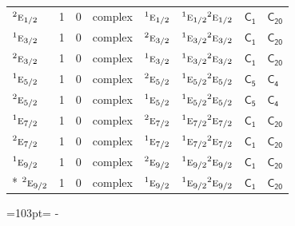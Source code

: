 \documentclass[10pt,a4paper]{article}
\newcommand{\needspace}[1]{\par\penalty-100\begingroup\dimen0=#1\relax\dimen2=\pagegoal
  \advance\dimen2-\pagetotal\ifdim\dimen0>\dimen2\relax\ifdim\dimen2>0pt\vfil\break\fi\fi
  \endgroup}
\numberwithin{equation}{section}
\newcommand{\grp}[1]{\mathsf{#1}}
\newcommand{\irr}[1]{\text{\normalfont\scshape #1}}
\newcommand{\conjpair}[1]{{}^{#1}}
\begin{document}
{\begin{longtable}{@{}lrrlllll@{}}
$\conjpair{2}\irr{e}_{1/2}$ & 1 & $0$ & complex & $\conjpair{1}\irr{e}_{1/2}$ & $\conjpair{1}\irr{e}_{1/2}\conjpair{2}\irr{e}_{1/2}$ & \href{C1.pdf}{$\grp{C_{1}}$} & $\grp{C_{20}}$\\
$\conjpair{1}\irr{e}_{3/2}$ & 1 & $0$ & complex & $\conjpair{2}\irr{e}_{3/2}$ & $\conjpair{1}\irr{e}_{3/2}\conjpair{2}\irr{e}_{3/2}$ & \href{C1.pdf}{$\grp{C_{1}}$} & $\grp{C_{20}}$\\
$\conjpair{2}\irr{e}_{3/2}$ & 1 & $0$ & complex & $\conjpair{1}\irr{e}_{3/2}$ & $\conjpair{1}\irr{e}_{3/2}\conjpair{2}\irr{e}_{3/2}$ & \href{C1.pdf}{$\grp{C_{1}}$} & $\grp{C_{20}}$\\
$\conjpair{1}\irr{e}_{5/2}$ & 1 & $0$ & complex & $\conjpair{2}\irr{e}_{5/2}$ & $\conjpair{1}\irr{e}_{5/2}\conjpair{2}\irr{e}_{5/2}$ & \href{C5.pdf}{$\grp{C_{5}}$} & \href{../../../rotation/data/pdf/C4.pdf}{$\grp{C_{4}}$}\\
$\conjpair{2}\irr{e}_{5/2}$ & 1 & $0$ & complex & $\conjpair{1}\irr{e}_{5/2}$ & $\conjpair{1}\irr{e}_{5/2}\conjpair{2}\irr{e}_{5/2}$ & \href{C5.pdf}{$\grp{C_{5}}$} & \href{../../../rotation/data/pdf/C4.pdf}{$\grp{C_{4}}$}\\
$\conjpair{1}\irr{e}_{7/2}$ & 1 & $0$ & complex & $\conjpair{2}\irr{e}_{7/2}$ & $\conjpair{1}\irr{e}_{7/2}\conjpair{2}\irr{e}_{7/2}$ & \href{C1.pdf}{$\grp{C_{1}}$} & $\grp{C_{20}}$\\
$\conjpair{2}\irr{e}_{7/2}$ & 1 & $0$ & complex & $\conjpair{1}\irr{e}_{7/2}$ & $\conjpair{1}\irr{e}_{7/2}\conjpair{2}\irr{e}_{7/2}$ & \href{C1.pdf}{$\grp{C_{1}}$} & $\grp{C_{20}}$\\
$\conjpair{1}\irr{e}_{9/2}$ & 1 & $0$ & complex & $\conjpair{2}\irr{e}_{9/2}$ & $\conjpair{1}\irr{e}_{9/2}\conjpair{2}\irr{e}_{9/2}$ & \href{C1.pdf}{$\grp{C_{1}}$} & $\grp{C_{20}}$\\*
$\conjpair{2}\irr{e}_{9/2}$ & 1 & $0$ & complex & $\conjpair{1}\irr{e}_{9/2}$ & $\conjpair{1}\irr{e}_{9/2}\conjpair{2}\irr{e}_{9/2}$ & \href{C1.pdf}{$\grp{C_{1}}$} & $\grp{C_{20}}$\\
\bottomrule\end{longtable}}
\needspace{103pt}
\end{document}
